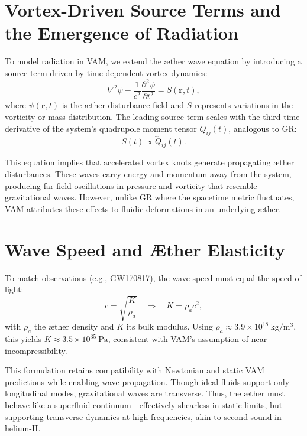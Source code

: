 
\section*{Vortex-Driven Source Terms and the Emergence of Radiation}

To model radiation in VAM, we extend the æther wave equation by introducing a source term driven by time-dependent vortex dynamics:
\begin{equation}
\nabla^2 \psi - \frac{1}{c^2} \frac{\partial^2 \psi}{\partial t^2} = S(\mathbf{r}, t),
\end{equation}
where $\psi(\mathbf{r}, t)$ is the æther disturbance field and $S$ represents variations in the vorticity or mass distribution. The leading source term scales with the third time derivative of the system’s quadrupole moment tensor $Q_{ij}(t)$, analogous to GR:
\begin{equation}
S(t) \propto \dddot{Q}_{ij}(t).
\end{equation}

This equation implies that accelerated vortex knots generate propagating æther disturbances. These waves carry energy and momentum away from the system, producing far-field oscillations in pressure and vorticity that resemble gravitational waves. However, unlike GR where the spacetime metric fluctuates, VAM attributes these effects to fluidic deformations in an underlying æther.

\section*{Wave Speed and Æther Elasticity}

To match observations (e.g., GW170817), the wave speed must equal the speed of light:
\begin{equation}
c = \sqrt{\frac{K}{\rho_a}} \quad \Rightarrow \quad K = \rho_a c^2,
\end{equation}
with $\rho_a$ the æther density and $K$ its bulk modulus. Using $\rho_a \approx 3.9 \times 10^{18}~\mathrm{kg/m^3}$, this yields $K \approx 3.5 \times 10^{35}~\mathrm{Pa}$, consistent with VAM's assumption of near-incompressibility.

This formulation retains compatibility with Newtonian and static VAM predictions while enabling wave propagation. Though ideal fluids support only longitudinal modes, gravitational waves are transverse. Thus, the æther must behave like a superfluid continuum—effectively shearless in static limits, but supporting transverse dynamics at high frequencies, akin to second sound in helium-II.


